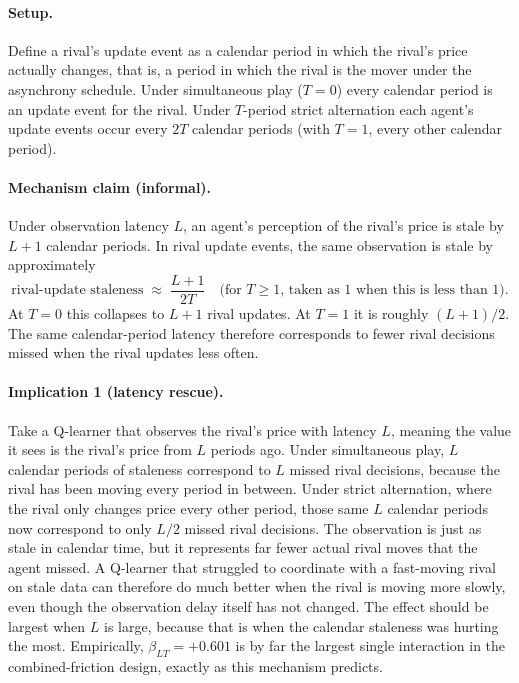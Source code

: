 \paragraph{Setup.} Define a rival's update event as a calendar period in which the rival's price actually changes, that is, a period in which the rival is the mover under the asynchrony schedule. Under simultaneous play ($T=0$) every calendar period is an update event for the rival. Under $T$-period strict alternation each agent's update events occur every $2T$ calendar periods (with $T=1$, every other calendar period).

\paragraph{Mechanism claim (informal).} Under observation latency $L$, an agent's perception of the rival's price is stale by $L+1$ calendar periods. In rival update events, the same observation is stale by approximately
\begin{equation*}
    \text{rival-update staleness} \;\approx\; \frac{L+1}{2T} \quad \text{(for $T\geq 1$, taken as 1 when this is less than 1).}
\end{equation*}
At $T=0$ this collapses to $L+1$ rival updates. At $T=1$ it is roughly $(L+1)/2$. The same calendar-period latency therefore corresponds to fewer rival decisions missed when the rival updates less often.

\paragraph{Implication 1 (latency rescue).} Take a Q-learner that observes the rival's price with latency $L$, meaning the value it sees is the rival's price from $L$ periods ago. Under simultaneous play, $L$ calendar periods of staleness correspond to $L$ missed rival decisions, because the rival has been moving every period in between. Under strict alternation, where the rival only changes price every other period, those same $L$ calendar periods now correspond to only $L/2$ missed rival decisions. The observation is just as stale in calendar time, but it represents far fewer actual rival moves that the agent missed. A Q-learner that struggled to coordinate with a fast-moving rival on stale data can therefore do much better when the rival is moving more slowly, even though the observation delay itself has not changed. The effect should be largest when $L$ is large, because that is when the calendar staleness was hurting the most. Empirically, $\beta_{LT} = +0.601$ is by far the largest single interaction in the combined-friction design, exactly as this mechanism predicts.

